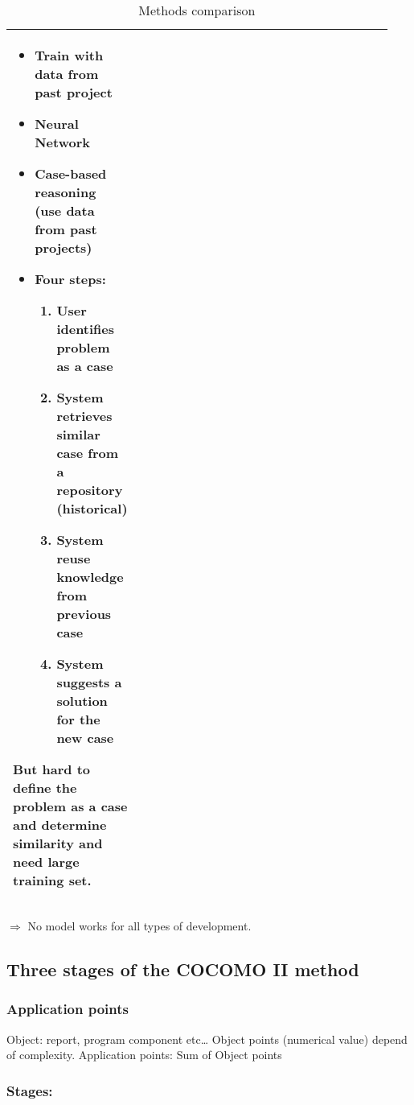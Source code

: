 \begin{table}[!ht]
\begin{tabular}{p{0.19\linewidth}|p{0.75\linewidth}}
\begin{minipage}{\linewidth}
\begin{itemize}
        					\item Train with data from past project
        					\item Neural Network
                                \item Case-based reasoning (use data from past projects)
                                \item Four steps:
                                    \begin{enumerate}
                                        \item User identifies problem as a case
                                        \item System retrieves similar case from a
                                            repository (historical)
                                        \item System reuse knowledge from previous
                                        case
                                        \item System suggests a solution for the
                                        new case
                                    \end{enumerate}
                            \end{itemize}
                            But hard to define the problem as a case and
                        determine similarity and need large training
                    set.\end{minipage} \\
        \bottomrule
    \end{tabular}
    \caption{Methods comparison}
\end{table}

$\Rightarrow$  No model works for all types of development.


\subsection{Three stages of the COCOMO II method}

\subsubsection{Application points}

Object: report, program component etc\ldots
Object points (numerical value) depend of complexity.
Application points: Sum of Object points

\subsubsection{Stages:}

